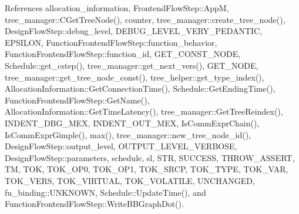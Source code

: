 References allocation\+\_\+information, Frontend\+Flow\+Step\+::\+AppM, tree\+\_\+manager\+::\+C\+Get\+Tree\+Node(), counter, tree\+\_\+manager\+::create\+\_\+tree\+\_\+node(), Design\+Flow\+Step\+::debug\+\_\+level, D\+E\+B\+U\+G\+\_\+\+L\+E\+V\+E\+L\+\_\+\+V\+E\+R\+Y\+\_\+\+P\+E\+D\+A\+N\+T\+IC, E\+P\+S\+I\+L\+ON, Function\+Frontend\+Flow\+Step\+::function\+\_\+behavior, Function\+Frontend\+Flow\+Step\+::function\+\_\+id, G\+E\+T\+\_\+\+C\+O\+N\+S\+T\+\_\+\+N\+O\+DE, Schedule\+::get\+\_\+cstep(), tree\+\_\+manager\+::get\+\_\+next\+\_\+vers(), G\+E\+T\+\_\+\+N\+O\+DE, tree\+\_\+manager\+::get\+\_\+tree\+\_\+node\+\_\+const(), tree\+\_\+helper\+::get\+\_\+type\+\_\+index(), Allocation\+Information\+::\+Get\+Connection\+Time(), Schedule\+::\+Get\+Ending\+Time(), Function\+Frontend\+Flow\+Step\+::\+Get\+Name(), Allocation\+Information\+::\+Get\+Time\+Latency(), tree\+\_\+manager\+::\+Get\+Tree\+Reindex(), I\+N\+D\+E\+N\+T\+\_\+\+D\+B\+G\+\_\+\+M\+EX, I\+N\+D\+E\+N\+T\+\_\+\+O\+U\+T\+\_\+\+M\+EX, Is\+Comm\+Expr\+Chain(), Is\+Comm\+Expr\+Gimple(), max(), tree\+\_\+manager\+::new\+\_\+tree\+\_\+node\+\_\+id(), Design\+Flow\+Step\+::output\+\_\+level, O\+U\+T\+P\+U\+T\+\_\+\+L\+E\+V\+E\+L\+\_\+\+V\+E\+R\+B\+O\+SE, Design\+Flow\+Step\+::parameters, schedule, sl, S\+TR, S\+U\+C\+C\+E\+SS, T\+H\+R\+O\+W\+\_\+\+A\+S\+S\+E\+RT, TM, T\+OK, T\+O\+K\+\_\+\+O\+P0, T\+O\+K\+\_\+\+O\+P1, T\+O\+K\+\_\+\+S\+R\+CP, T\+O\+K\+\_\+\+T\+Y\+PE, T\+O\+K\+\_\+\+V\+AR, T\+O\+K\+\_\+\+V\+E\+RS, T\+O\+K\+\_\+\+V\+I\+R\+T\+U\+AL, T\+O\+K\+\_\+\+V\+O\+L\+A\+T\+I\+LE, U\+N\+C\+H\+A\+N\+G\+ED, fu\+\_\+binding\+::\+U\+N\+K\+N\+O\+WN, Schedule\+::\+Update\+Time(), and Function\+Frontend\+Flow\+Step\+::\+Write\+B\+B\+Graph\+Dot().

